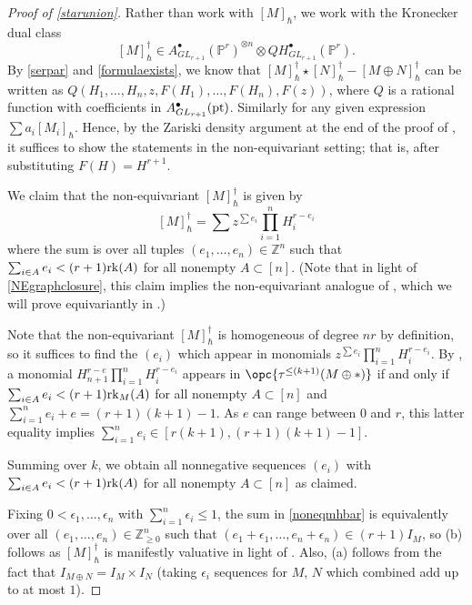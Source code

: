 \documentclass[12pt]{amsart}
\newcommand{\mb}{\mathbb}
\newcommand{\pt}{{\rm pt}}
\newcommand{\rk}{{\rm rk}}
\theoremstyle{plain}
\theoremstyle{definition}
\theoremstyle{remark}
\begin{document}
\begin{proof}[Proof of \cref{starunion}]
Rather than work with $[M]_\hbar$, we work with the Kronecker dual class \[[M]_\hbar^\dagger \in A^\bullet_{GL_{r+1}}(\mb{P}^r)^{\otimes n}\otimes QH^\bullet_{GL_{r+1}}(\mb{P}^r).\] By \cref{serpar} and \cref{formulaexists}, we know that $[M]_\hbar^\dagger \star [N]_\hbar^\dagger-[M \oplus N]_\hbar^\dagger$ can be written as $Q(H_1,\ldots,H_n, z,F(H_1),\ldots,F(H_n), F(z))$, where $Q$ is a rational function with coefficients in $A^\bullet_{GL_{r+1}}(\pt)$. Similarly for any given expression $\sum a_i [M_i]_\hbar$. Hence, by the Zariski density argument at the end of the proof of , it suffices to show the statements in the non-equivariant setting; that is, after substituting $F(H)=H^{r+1}$.

We claim that the non-equivariant $[M]_\hbar^\dagger$ is given by \begin{equation} \label{noneqmhbar} [M]_\hbar^\dagger=\sum z^{\sum e_i}\prod_{i=1}^n H_i^{r-e_i}\end{equation} where the sum is over all tuples $(e_1, \ldots, e_n)\in \mb{Z}^n$ such that
$\sum_{i \in A} e_i < (r+1)\rk(A)$ for all nonempty $A\subset [n]$. (Note that in light of \cref{NEgraphclosure}, this claim implies the non-equivariant analogue of , which we will prove equivariantly in .)

Note that the non-equivariant $[M]_\hbar^\dagger$ is homogeneous of degree $nr$ by definition, so it suffices to find the $(e_i)$ which appear in monomials $z^{\sum e_i}\prod_{i=1}^n H_i^{r-e_i}$. By , a monomial $H_{n+1}^{r-e}\prod_{i=1}^n H_i^{r-e_i}$ appears in $\opc{\tau^{\le (k+1)}(M\oplus \ast)}$ if and only if $\sum_{i \in A} e_i < (r+1)\rk_M(A)$ for all nonempty $A \subset [n]$ and $\sum_{i=1}^n e_i + e=(r+1)(k+1)-1$. As $e$ can range between $0$ and $r$, this latter equality implies $\sum_{i=1}^n e_i \in [r(k+1),(r+1)(k+1)-1]$.

Summing over $k$, we obtain all nonnegative sequences $(e_i)$ with $\sum_{i \in A} e_i < (r+1)\rk(A)$ for all nonempty $A \subset [n]$ as claimed.

Fixing $0<\epsilon_1,\ldots,\epsilon_n$ with $\sum_{i=1}^n \epsilon_i \le 1$, the sum in \eqref{noneqmhbar} is equivalently over all $(e_1, \ldots, e_n)\in \mb{Z}_{\ge 0}^n$ such that $(e_1+\epsilon_1, \ldots, e_n + \epsilon_n) \in (r+1)I_M$, so (b) follows as $[M]_{\hbar}^\dagger$ is manifestly valuative in light of .
Also, (a) follows from the fact that $I_{M \oplus N} = I_M \times I_N$ (taking $\epsilon_i$ sequences for $M$, $N$ which combined add up to at most $1$).
\end{proof}
\end{document}
